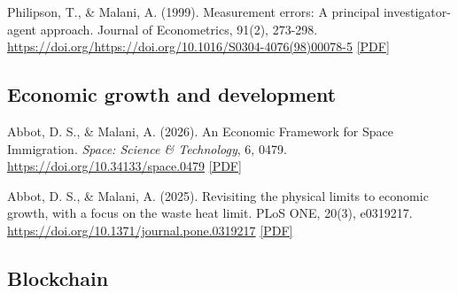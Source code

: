 \begin{tablist}
        \item[1999] \tab{}Philipson, T., \& Malani, A. (1999). Measurement errors: A principal investigator-agent approach. Journal of Econometrics, 91(2), 273-298. \href{https://doi.org/https://doi.org/10.1016/S0304-4076(98)00078-5}{https://doi.org/https://doi.org/10.1016/S0304-4076(98)00078-5} \href{https://github.com/anup-malani/website_personal/blob/main/publications/1999_PhilipsonMalani_MeasurementErrors.pdf}{[PDF]}
        
    \end{tablist}

    \subsection*{Economic growth and development}

    \begin{tablist}

        \item[2026] \tab{}Abbot, D. S., \& Malani, A. (2026). An Economic Framework for Space Immigration. \textit{Space: Science \& Technology}, 6, 0479. \href{https://doi.org/10.34133/space.0479}{https://doi.org/10.34133/space.0479} \href{https://github.com/anup-malani/website_personal/blob/main/publications/2026_AbbotMalani_SpaceSciTech_SpaceImmigration.pdf}{[PDF]}

        \item[2025] \tab{}Abbot, D. S., \& Malani, A. (2025). Revisiting the physical limits to economic growth, with a focus on the waste heat limit. PLoS ONE, 20(3), e0319217. \href{https://doi.org/10.1371/journal.pone.0319217}{https://doi.org/10.1371/journal.pone.0319217}  \href{https://github.com/anup-malani/website_personal/blob/main/publications/2025_AbbotMalani_LimitsGrowth.pdf}{[PDF]}


    \end{tablist}

    \subsection*{Blockchain}

